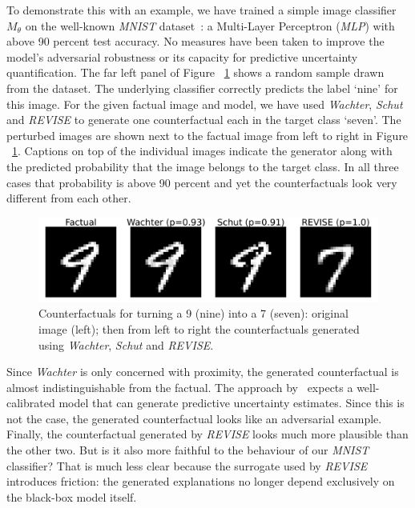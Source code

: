 To demonstrate this with an example, we have trained a simple image classifier $M_{\theta}$ on the well-known \textit{MNIST} dataset~\citep{lecun1998mnist}: a Multi-Layer Perceptron (\textit{MLP}) with above 90 percent test accuracy. No measures have been taken to improve the model's adversarial robustness or its capacity for predictive uncertainty quantification. The far left panel of Figure ~\ref{fig:motiv} shows a random sample drawn from the dataset. The underlying classifier correctly predicts the label `nine' for this image. For the given factual image and model, we have used \textit{Wachter}, \textit{Schut} and \textit{REVISE} to generate one counterfactual each in the target class `seven'. The perturbed images are shown next to the factual image from left to right in Figure ~\ref{fig:motiv}. Captions on top of the individual images indicate the generator along with the predicted probability that the image belongs to the target class. In all three cases that probability is above 90 percent and yet the counterfactuals look very different from each other.

\begin{figure}
  \centering
  \includegraphics[width=0.8\linewidth]{../artifacts/results/images/mnist_motivation.png}
  \caption{Counterfactuals for turning a 9 (nine) into a 7 (seven): original image (left); then from left to right the counterfactuals generated using \textit{Wachter}, \textit{Schut} and \textit{REVISE}.}\label{fig:motiv}
\end{figure}

Since \textit{Wachter} is only concerned with proximity, the generated counterfactual is almost indistinguishable from the factual. The approach by~\citet{schut2021generating} expects a well-calibrated model that can generate predictive uncertainty estimates. Since this is not the case, the generated counterfactual looks like an adversarial example. Finally, the counterfactual generated by \textit{REVISE} looks much more plausible than the other two. But is it also more faithful to the behaviour of our \textit{MNIST} classifier? That is much less clear because the surrogate used by \textit{REVISE} introduces friction: the generated explanations no longer depend exclusively on the black-box model itself. 

